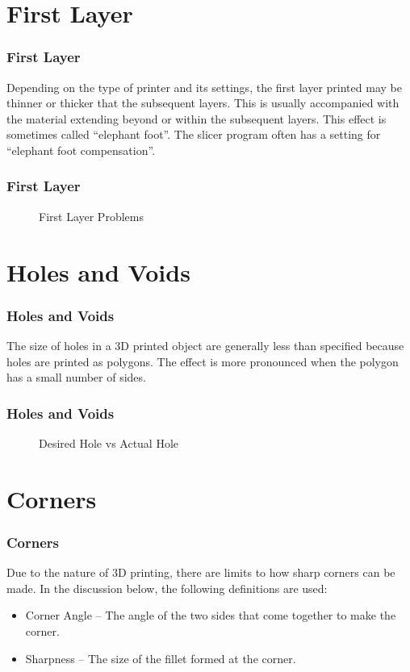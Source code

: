 \documentclass[english,10pt]{beamer}
\begin{document}
\section{First Layer}
\begin{frame}
  \frametitle{First Layer}
  Depending on the type of printer and its settings, the first layer printed may be thinner or thicker that the subsequent layers.  This is usually accompanied with the material extending beyond or within the subsequent layers.  This effect is sometimes called ``elephant foot''.  The slicer program often has a setting for ``elephant foot compensation''.
\end{frame}
\begin{frame}
  \frametitle{First Layer}
  \begin{figure}
    
    \caption{First Layer Problems}
  \end{figure}
\end{frame}

\section{Holes and Voids}
\begin{frame}
  \frametitle{Holes and Voids}
  The size of holes in a 3D printed object are generally less than specified because holes are printed as polygons.  The effect is more pronounced when the polygon has a small number of sides.
\end{frame}

\begin{frame}
  \frametitle{Holes and Voids}
  \begin{figure}
    
    \caption{Desired Hole vs Actual Hole}
  \end{figure}
\end{frame}

\section{Corners}
\begin{frame}
  \frametitle{Corners}
  Due to the nature of 3D printing, there are limits to how sharp corners can be made.  In the discussion below, the following definitions are used:
  \begin{itemize}
    \item Corner Angle -- The angle of the two sides that come together to make the corner.
    \item Sharpness -- The size of the fillet formed at the corner.
  \end{itemize}
\end{frame}
\end{document}
